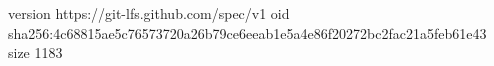 version https://git-lfs.github.com/spec/v1
oid sha256:4c68815ae5c76573720a26b79ce6eeab1e5a4e86f20272bc2fac21a5feb61e43
size 1183
